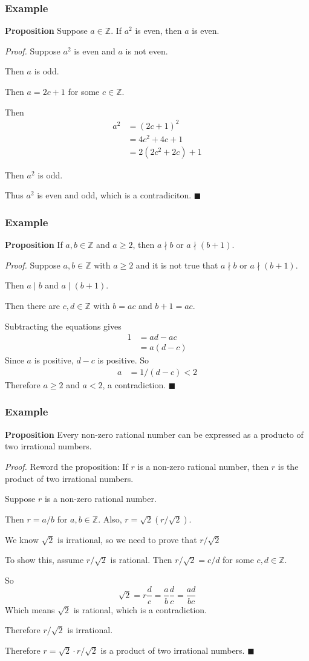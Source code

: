 \documentclass{beamer}
\newcommand{\ints}{\ensuremath{\mathbb{Z}}}
\newcommand{\QED}{\hfill\ensuremath{\blacksquare}}
\newcommand{\bfr}[1]{\begin{frame}[fragile]\frametitle{{ #1 }}}
\begin{document}
\bfr{Example}

{\bf Proposition}  Suppose $a\in\ints$.  If $a^2$ is even, then $a$ is
even.

{\it Proof.}  Suppose $a^2$ is even and $a$ is not even.

Then $a$ is odd.

Then $a=2c+1$ for some $c\in\ints$.

Then \begin{align*}
  a^2 &= (2c+1)^2 \\
  &= 4c^2 + 4c + 1\\
  &= 2(2c^2 + 2c) + 1 
\end{align*}

Then $a^2$ is odd.

Thus $a^2$ is even and odd, which is a contradiciton. \QED

\end{frame}


\bfr{Example}

{\bf Proposition}  If $a,b\in\ints$ and $a\geq 2$, then $a\nmid b$ or
$a\nmid (b+1)$.

{\it Proof.}  Suppose $a,b\in\ints$ with $a\geq 2$ and it is not true
that $a\nmid b$ or
$a\nmid (b+1)$.

Then $a\mid b$ and $a\mid (b+1)$.

Then there are $c,d\in\ints$ with $b=ac$ and $b+1=ac$.

Subtracting the equations gives
\begin{align*}
  1 &= ad-ac\\
  &= a(d-c)
\end{align*}
Since $a$ is positive, $d-c$ is positive.
So
\begin{align*}
  a &= 1/(d-c) < 2
\end{align*}
Therefore $a\geq 2$ and $a<2$, a contradiction. \QED

\end{frame}

\bfr{Example}

{\bf Proposition}  Every non-zero rational number can be expressed as
a producto of two irrational numbers.

{\it Proof.}  Reword the proposition:
If $r$ is a non-zero rational number, then $r$ is the product of two
irrational numbers.

Suppose $r$ is a non-zero rational number.

Then $r=a/b$ for $a,b\in\ints$.  Also,
$r = \sqrt{2}({r}/{\sqrt{2}})$.

We know $\sqrt{2}$ is irrational, so we need to prove that
$r/{\sqrt{2}}$

To show this, assume $r/\sqrt{2}$ is rational.  Then
${r}/{\sqrt{2}} = {c}/{d}$
for some $c,d\in\ints$.

So
\[
  \sqrt{2} = r\frac{d}{c}
  = \frac{a}{b}\frac{d}{c}
  = \frac{ad}{bc}
\]
Which means $\sqrt{2}$ is rational, which is a contradiction.

Therefore $r/\sqrt{2}$ is irrational.

Therefore $r=\sqrt{2}\cdot r/\sqrt{2}$ is a product of two irrational
numbers. \QED

\end{frame}
\end{document}
